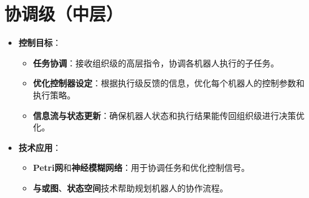 \documentclass[12pt,a4paper,UTF8]{article}
\begin{document}
\section{协调级（中层）}
\begin{itemize}
    \item \textbf{控制目标}：
    \begin{itemize}
        \item \textbf{任务协调}：接收组织级的高层指令，协调各机器人执行的子任务。
        \item \textbf{优化控制器设定}：根据执行级反馈的信息，优化每个机器人的控制参数和执行策略。
        \item \textbf{信息流与状态更新}：确保机器人状态和执行结果能传回组织级进行决策优化。
    \end{itemize}
    \item \textbf{技术应用}：
    \begin{itemize}
        \item \textbf{Petri网}和\textbf{神经模糊网络}：用于协调任务和优化控制信号。
        \item \textbf{与或图}、\textbf{状态空间}技术帮助规划机器人的协作流程。
    \end{itemize}
\end{itemize}
\end{document}
